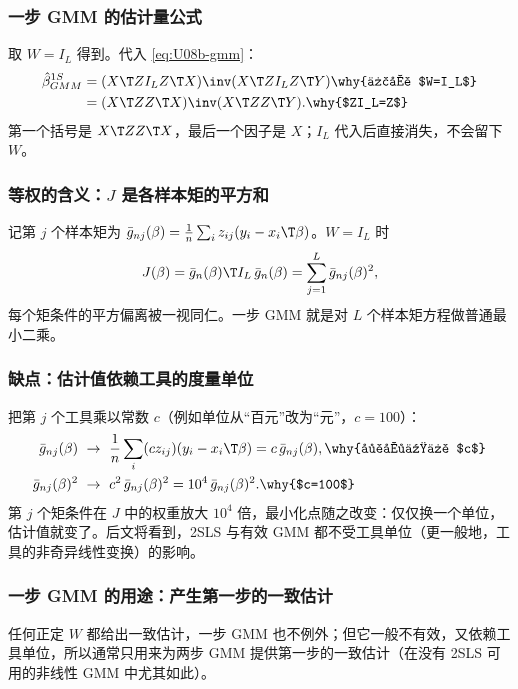 \subsubsection{一步 GMM 的估计量公式}

取 $W=I_L$ 得到。代入 \eqref{eq:U08b-gmm}：
\begin{align*}
\hat\beta^{1S}_{GMM}&=(X\T ZI_LZ\T X)\inv(X\T ZI_LZ\T Y) \why{代入 $W=I_L$}\\
&=(X\T ZZ\T X)\inv(X\T ZZ\T Y). \why{$ZI_L=Z$}
\end{align*}
第一个括号是 $X\T ZZ\T X$，最后一个因子是 $X$；$I_L$ 代入后直接消失，不会留下 $W$。

\subsubsection{等权的含义：\texorpdfstring{$J$}{J} 是各样本矩的平方和}

记第 $j$ 个样本矩为 $\bar g_{nj}(\beta)=\frac1n\sum_iz_{ij}(y_i-x_i\T\beta)$。$W=I_L$ 时
\[
J(\beta)=\bar g_n(\beta)\T I_L\,\bar g_n(\beta)=\sum_{j=1}^L\bar g_{nj}(\beta)^2 ,
\]
每个矩条件的平方偏离被一视同仁。一步 GMM 就是对 $L$ 个样本矩方程做普通最小二乘。

\subsubsection{缺点：估计值依赖工具的度量单位}

把第 $j$ 个工具乘以常数 $c$（例如单位从“百元”改为“元”，$c=100$）：
\begin{align*}
\bar g_{nj}(\beta)&\ \to\ \frac1n\sum_i(cz_{ij})(y_i-x_i\T\beta)=c\,\bar g_{nj}(\beta), \why{工具乘以 $c$}\\
\bar g_{nj}(\beta)^2&\ \to\ c^2\,\bar g_{nj}(\beta)^2=10^4\,\bar g_{nj}(\beta)^2 . \why{$c=100$}
\end{align*}
第 $j$ 个矩条件在 $J$ 中的权重放大 $10^4$ 倍，最小化点随之改变：仅仅换一个单位，估计值就变了。后文将看到，2SLS 与有效 GMM 都不受工具单位（更一般地，工具的非奇异线性变换）的影响。

\subsubsection{一步 GMM 的用途：产生第一步的一致估计}

任何正定 $W$ 都给出一致估计，一步 GMM 也不例外；但它一般不有效，又依赖工具单位，所以通常只用来为两步 GMM 提供第一步的一致估计（在没有 2SLS 可用的非线性 GMM 中尤其如此）。

